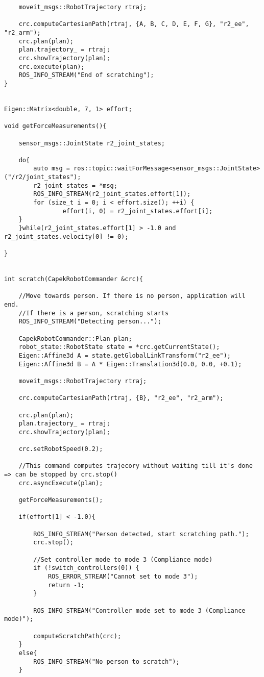 \begin{lstlisting}
	moveit_msgs::RobotTrajectory rtraj;

	crc.computeCartesianPath(rtraj, {A, B, C, D, E, F, G}, "r2_ee", "r2_arm");
	crc.plan(plan);
	plan.trajectory_ = rtraj;
	crc.showTrajectory(plan);
	crc.execute(plan);
	ROS_INFO_STREAM("End of scratching");
}


Eigen::Matrix<double, 7, 1> effort;

void getForceMeasurements(){

	sensor_msgs::JointState r2_joint_states;

	do{
		auto msg = ros::topic::waitForMessage<sensor_msgs::JointState>("/r2/joint_states");
		r2_joint_states = *msg;
		ROS_INFO_STREAM(r2_joint_states.effort[1]);
		for (size_t i = 0; i < effort.size(); ++i) {
        		effort(i, 0) = r2_joint_states.effort[i];
	}
	}while(r2_joint_states.effort[1] > -1.0 and r2_joint_states.velocity[0] != 0);

}


int scratch(CapekRobotCommander &crc){

	//Move towards person. If there is no person, application will end.
	//If there is a person, scratching starts
	ROS_INFO_STREAM("Detecting person...");

	CapekRobotCommander::Plan plan;
	robot_state::RobotState state = *crc.getCurrentState();
	Eigen::Affine3d A = state.getGlobalLinkTransform("r2_ee");
	Eigen::Affine3d B = A * Eigen::Translation3d(0.0, 0.0, +0.1);

	moveit_msgs::RobotTrajectory rtraj;

	crc.computeCartesianPath(rtraj, {B}, "r2_ee", "r2_arm");

	crc.plan(plan);
	plan.trajectory_ = rtraj;
	crc.showTrajectory(plan);

	crc.setRobotSpeed(0.2);

	//This command computes trajecory without waiting till it's done => can be stopped by crc.stop()
	crc.asyncExecute(plan);

	getForceMeasurements();

	if(effort[1] < -1.0){
		
		ROS_INFO_STREAM("Person detected, start scratching path.");
		crc.stop();

		//Set controller mode to mode 3 (Compliance mode)
		if (!switch_controllers(0)) {
			ROS_ERROR_STREAM("Cannot set to mode 3");
			return -1;
		}

		ROS_INFO_STREAM("Controller mode set to mode 3 (Compliance mode)");

		computeScratchPath(crc);
	}
	else{
		ROS_INFO_STREAM("No person to scratch");
	}


\end{lstlisting}
